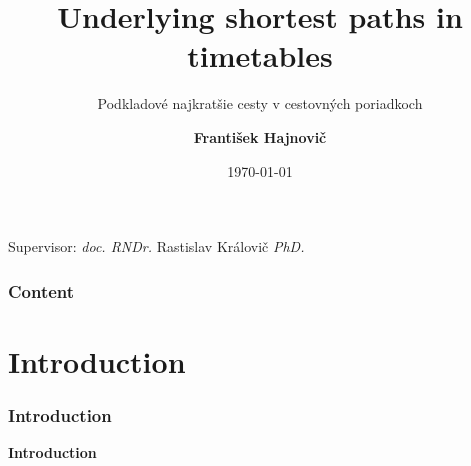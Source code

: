 \documentclass[]{beamer}
\title{\textbf{Underlying shortest paths in timetables}}
\subtitle{Podkladové najkratšie cesty v cestovných poriadkoch}
\author{\textbf{František Hajnovič}}
\institute{FMFI UK}
\date{\today}
\begin{document}
	{
    \begin{frame}
        \titlepage
        \begin{center}
            Supervisor: \textit{doc. RNDr.} Rastislav Královič \textit{PhD.}
        \end{center}
    \end{frame}
    }

    \begin{frame}
        \frametitle{Content}
        \tableofcontents
    \end{frame}

    \section{Introduction}
    \begin{frame}
        \frametitle{Introduction}
        \begin{center}
            \textcolor{elcon-clr!80!black}{\textbf{Introduction}}
        \end{center}
    \end{frame}
\end{document}
